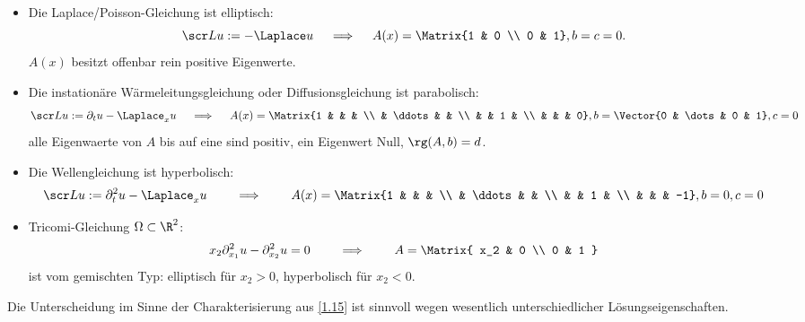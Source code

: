 \begin{ex} \label{1.16}
	\begin{itemize}
		\item
			Die Laplace/Poisson-Gleichung ist elliptisch:
			\[
				\scr L u := - \Laplace u
				\quad \implies \quad A(x) = \Matrix{1 & 0 \\ 0 & 1}, b = c = 0.
			\]
			$A(x)$ besitzt offenbar rein positive Eigenwerte.
		\item
			Die instationäre Wärmeleitungsgleichung oder Diffusionsgleichung ist parabolisch:
			\[
				\scr L u := \partial_t u - \Laplace_x u
				\quad \implies \quad
				A(x) = \Matrix{1 &  &  &  \\ & \ddots & & \\ & & 1 & \\ & & & 0}, b = \Vector{0 & \dots & 0 & 1}, c = 0
			\]
			alle Eigenwaerte von $A$ bis auf eine sind positiv, ein Eigenwert Null, $\rg(A, b) = d$.
		\item
			Die Wellengleichung ist hyperbolisch:
			\[
				\scr L u := \partial_t^2 u - \Laplace_x u
				\qquad \implies \qquad
				A(x) = \Matrix{1 &  &  &  \\ & \ddots & & \\ & & 1 & \\ & & & -1}, b = 0, c = 0
			\]
		\item
			Tricomi-Gleichung $\Omega \subset \R^2$:
			\[
				x_2 \partial_{x_1}^2 u - \partial_{x_2}^2 u = 0
				\qquad \implies \qquad
				A = \Matrix{ x_2 & 0 \\ 0 & 1 }
			\]
			ist vom gemischten Typ: elliptisch für $x_2 > 0$, hyperbolisch für $x_2 < 0$.
	\end{itemize}
\end{ex}

Die Unterscheidung im Sinne der Charakterisierung aus \ref{1.15} ist sinnvoll wegen wesentlich unterschiedlicher Lösungseigenschaften.

